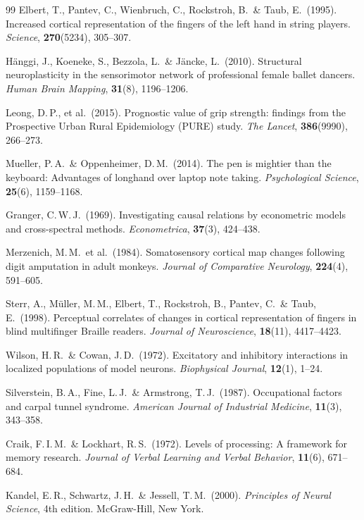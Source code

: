 ﻿\documentclass[12pt,a4paper]{report}
\theoremstyle{plain}
\theoremstyle{definition}
\theoremstyle{remark}
\begin{document}
\begin{thebibliography}{99}
Elbert, T., Pantev, C., Wienbruch, C., Rockstroh, B.\ \& Taub, E.\ (1995).
Increased cortical representation of the fingers of the left hand in string
players. \emph{Science}, \textbf{270}(5234), 305--307.

Hänggi, J., Koeneke, S., Bezzola, L.\ \& Jäncke, L.\ (2010). Structural
neuroplasticity in the sensorimotor network of professional female ballet
dancers. \emph{Human Brain Mapping}, \textbf{31}(8), 1196--1206.

Leong, D.\,P., et al.\ (2015). Prognostic value of grip strength: findings
from the Prospective Urban Rural Epidemiology (PURE) study.
\emph{The Lancet}, \textbf{386}(9990), 266--273.

Mueller, P.\,A.\ \& Oppenheimer, D.\,M.\ (2014). The pen is mightier
than the keyboard: Advantages of longhand over laptop note taking.
\emph{Psychological Science}, \textbf{25}(6), 1159--1168.

Granger, C.\,W.\,J.\ (1969). Investigating causal relations by econometric
models and cross-spectral methods. \emph{Econometrica}, \textbf{37}(3), 424--438.

Merzenich, M.\,M.\ et al.\ (1984). Somatosensory cortical map changes
following digit amputation in adult monkeys. \emph{Journal of Comparative
Neurology}, \textbf{224}(4), 591--605.

Sterr, A., Müller, M.\,M., Elbert, T., Rockstroh, B., Pantev, C.\
\& Taub, E.\ (1998). Perceptual correlates of changes in cortical
representation of fingers in blind multifinger Braille readers.
\emph{Journal of Neuroscience}, \textbf{18}(11), 4417--4423.

Wilson, H.\,R.\ \& Cowan, J.\,D.\ (1972). Excitatory and inhibitory
interactions in localized populations of model neurons. \emph{Biophysical
Journal}, \textbf{12}(1), 1--24.

Silverstein, B.\,A., Fine, L.\,J.\ \& Armstrong, T.\,J.\ (1987).
Occupational factors and carpal tunnel syndrome. \emph{American Journal
of Industrial Medicine}, \textbf{11}(3), 343--358.

Craik, F.\,I.\,M.\ \& Lockhart, R.\,S.\ (1972). Levels of processing:
A framework for memory research. \emph{Journal of Verbal Learning and
Verbal Behavior}, \textbf{11}(6), 671--684.

Kandel, E.\,R., Schwartz, J.\,H.\ \& Jessell, T.\,M.\ (2000).
\emph{Principles of Neural Science}, 4th edition. McGraw-Hill, New York.


\end{thebibliography}
\end{document}
